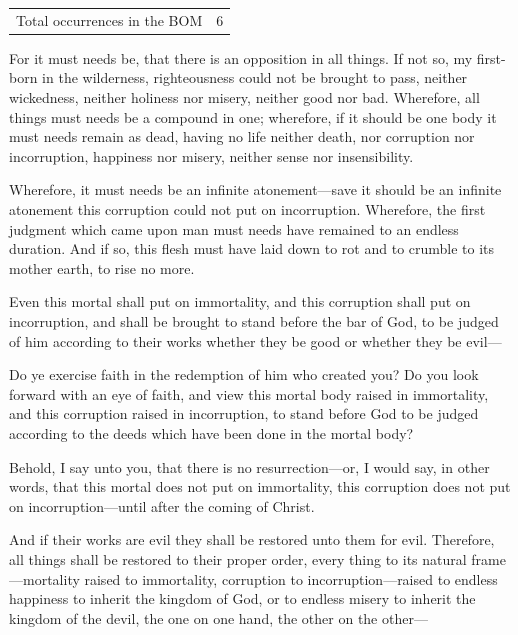 		\begin{tabular}{ll}
			Total occurrences in the BOM & 6
		\end{tabular}
		
		\begin{compactdesc}
			\item[2 Nephi 2:11] For it must needs be, that there is an opposition in all things. If not so, my first-born in the wilderness, righteousness could not be brought to pass, neither wickedness, neither holiness nor misery, neither good nor bad. Wherefore, all things must needs be a compound in one; wherefore, if it should be one body it must needs remain as dead, having no life neither death, nor corruption nor incorruption, happiness nor misery, neither sense nor insensibility.
			\item[2 Nephi 9:7] Wherefore, it must needs be an infinite atonement---save it should be an infinite atonement this corruption could not put on incorruption. Wherefore, the first judgment which came upon man must needs have remained to an endless duration. And if so, this flesh must have laid down to rot and to crumble to its mother earth, to rise no more.
			\item[Mosiah 16:10] Even this mortal shall put on immortality, and this corruption shall put on incorruption, and shall be brought to stand before the bar of God, to be judged of him according to their works whether they be good or whether they be evil---
			\item[Alma 5:15] Do ye exercise faith in the redemption of him who created you? Do you look forward with an eye of faith, and view this mortal body raised in immortality, and this corruption raised in incorruption, to stand before God to be judged according to the deeds which have been done in the mortal body?
			\item[Alma 40:2] Behold, I say unto you, that there is no resurrection---or, I would say, in other words, that this mortal does not put on immortality, this corruption does not put on incorruption---until after the coming of Christ.
			\item[Alma 41:4] And if their works are evil they shall be restored unto them for evil. Therefore, all things shall be restored to their proper order, every thing to its natural frame---mortality raised to immortality, corruption to incorruption---raised to endless happiness to inherit the kingdom of God, or to endless misery to inherit the kingdom of the devil, the one on one hand, the other on the other---
		\end{compactdesc}
		
